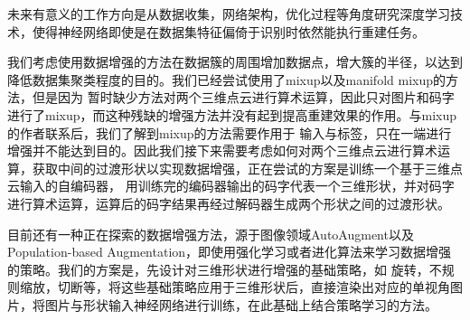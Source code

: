 \documentclass[bachelor, nocolorlinks, printoneside]{seuthesis} %
\begin{document}
\begin{Main}
未来有意义的工作方向是从数据收集，网络架构，优化过程等角度研究深度学习技术，使得神经网络即使是在数据集特征偏倚于识别时依然能执行重建任务。

我们考虑使用数据增强的方法在数据簇的周围增加数据点，增大簇的半径，以达到降低数据集聚类程度的目的。我们已经尝试使用了mixup以及manifold mixup的方法，但是因为
暂时缺少方法对两个三维点云进行算术运算，因此只对图片和码字进行了mixup，而这种残缺的增强方法并没有起到提高重建效果的作用。与mixup的作者联系后，我们了解到mixup的方法需要作用于
输入与标签，只在一端进行增强并不能达到目的。因此我们接下来需要考虑如何对两个三维点云进行算术运算，获取中间的过渡形状以实现数据增强，正在尝试的方案是训练一个基于三维点云输入的自编码器，
用训练完的编码器输出的码字代表一个三维形状，并对码字进行算术运算，运算后的码字结果再经过解码器生成两个形状之间的过渡形状。

目前还有一种正在探索的数据增强方法，源于图像领域AutoAugment以及Population-based Augmentation，即使用强化学习或者进化算法来学习数据增强的策略。我们的方案是，先设计对三维形状进行增强的基础策略，如
旋转，不规则缩放，切断等，将这些基础策略应用于三维形状后，直接渲染出对应的单视角图片，将图片与形状输入神经网络进行训练，在此基础上结合策略学习的方法。

\end{Main} %



\end{document}
